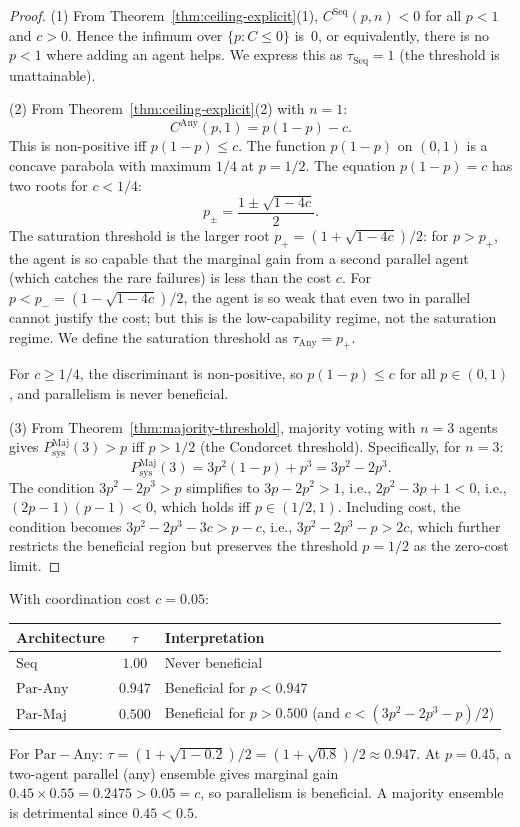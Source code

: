 \begin{proof}
(1) From Theorem~\ref{thm:ceiling-explicit}(1), $C^{\mathrm{Seq}}(p,n) < 0$
for all $p < 1$ and $c > 0$. Hence the infimum over $\{p : C \leq 0\}$ is~$0$,
or equivalently, there is no $p < 1$ where adding an agent helps. We express this
as $\tau_{\mathrm{Seq}} = 1$ (the threshold is unattainable).

(2) From Theorem~\ref{thm:ceiling-explicit}(2) with $n = 1$:
\[
  C^{\mathrm{Any}}(p, 1) = p(1-p) - c.
\]
This is non-positive iff $p(1-p) \leq c$. The function $p(1-p)$ on $(0,1)$ is a
concave parabola with maximum $1/4$ at $p = 1/2$. The equation $p(1-p) = c$ has
two roots for $c < 1/4$:
\[
  p_{\pm} = \frac{1 \pm \sqrt{1-4c}}{2}.
\]
The saturation threshold is the larger root $p_+ = (1 + \sqrt{1-4c})/2$: for
$p > p_+$, the agent is so capable that the marginal gain from a second parallel
agent (which catches the rare failures) is less than the cost $c$. For
$p < p_- = (1 - \sqrt{1-4c})/2$, the agent is so weak that even two in parallel
cannot justify the cost; but this is the low-capability regime, not the saturation
regime. We define the saturation threshold as $\tau_{\mathrm{Any}} = p_+$.

For $c \geq 1/4$, the discriminant is non-positive, so $p(1-p) \leq c$ for all
$p \in (0,1)$, and parallelism is never beneficial.

(3) From Theorem~\ref{thm:majority-threshold}, majority voting with $n = 3$ agents
gives $P_{\mathrm{sys}}^{\mathrm{Maj}}(3) > p$ iff $p > 1/2$ (the Condorcet threshold).
Specifically, for $n = 3$:
\[
  P_{\mathrm{sys}}^{\mathrm{Maj}}(3) = 3p^2(1-p) + p^3 = 3p^2 - 2p^3.
\]
The condition $3p^2 - 2p^3 > p$ simplifies to $3p - 2p^2 > 1$, i.e.,
$2p^2 - 3p + 1 < 0$, i.e., $(2p-1)(p-1) < 0$, which holds iff $p \in (1/2, 1)$.
Including cost, the condition becomes $3p^2 - 2p^3 - 3c > p - c$, i.e.,
$3p^2 - 2p^3 - p > 2c$, which further restricts the beneficial region but preserves
the threshold $p = 1/2$ as the zero-cost limit.
\end{proof}

\begin{example}[Saturation Thresholds at $c = 0.05$]
\label{ex:saturation-thresholds}
With coordination cost $c = 0.05$:
\begin{center}
\begin{tabular}{l|c|l}
Architecture & $\tau$ & Interpretation \\
\hline
$\mathrm{Seq}$ & $1.00$ & Never beneficial \\
$\mathrm{Par\text{-}Any}$ & $0.947$ & Beneficial for $p < 0.947$ \\
$\mathrm{Par\text{-}Maj}$ & $0.500$ & Beneficial for $p > 0.500$ (and $c < (3p^2-2p^3-p)/2$) \\
\end{tabular}
\end{center}
For $\mathrm{Par-Any}$: $\tau = (1+\sqrt{1-0.2})/2 = (1+\sqrt{0.8})/2 \approx 0.947$.
At $p = 0.45$, a two-agent parallel (any) ensemble gives marginal gain
$0.45 \times 0.55 = 0.2475 > 0.05 = c$, so parallelism is beneficial. A majority
ensemble is detrimental since $0.45 < 0.5$.
\end{example}

